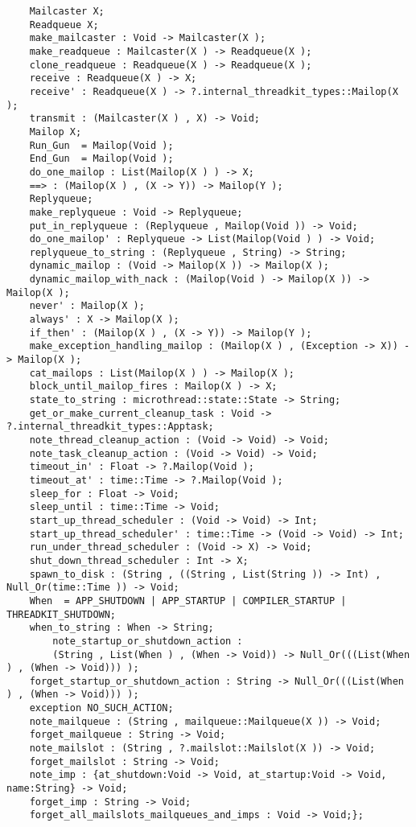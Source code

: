 \begin{verbatim}
    Mailcaster X;
    Readqueue X;
    make_mailcaster : Void -> Mailcaster(X );
    make_readqueue : Mailcaster(X ) -> Readqueue(X );
    clone_readqueue : Readqueue(X ) -> Readqueue(X );
    receive : Readqueue(X ) -> X;
    receive' : Readqueue(X ) -> ?.internal_threadkit_types::Mailop(X );
    transmit : (Mailcaster(X ) , X) -> Void;
    Mailop X;
    Run_Gun  = Mailop(Void );
    End_Gun  = Mailop(Void );
    do_one_mailop : List(Mailop(X ) ) -> X;
    ==> : (Mailop(X ) , (X -> Y)) -> Mailop(Y );
    Replyqueue;
    make_replyqueue : Void -> Replyqueue;
    put_in_replyqueue : (Replyqueue , Mailop(Void )) -> Void;
    do_one_mailop' : Replyqueue -> List(Mailop(Void ) ) -> Void;
    replyqueue_to_string : (Replyqueue , String) -> String;
    dynamic_mailop : (Void -> Mailop(X )) -> Mailop(X );
    dynamic_mailop_with_nack : (Mailop(Void ) -> Mailop(X )) -> Mailop(X );
    never' : Mailop(X );
    always' : X -> Mailop(X );
    if_then' : (Mailop(X ) , (X -> Y)) -> Mailop(Y );
    make_exception_handling_mailop : (Mailop(X ) , (Exception -> X)) -> Mailop(X );
    cat_mailops : List(Mailop(X ) ) -> Mailop(X );
    block_until_mailop_fires : Mailop(X ) -> X;
    state_to_string : microthread::state::State -> String;
    get_or_make_current_cleanup_task : Void -> ?.internal_threadkit_types::Apptask;
    note_thread_cleanup_action : (Void -> Void) -> Void;
    note_task_cleanup_action : (Void -> Void) -> Void;
    timeout_in' : Float -> ?.Mailop(Void );
    timeout_at' : time::Time -> ?.Mailop(Void );
    sleep_for : Float -> Void;
    sleep_until : time::Time -> Void;
    start_up_thread_scheduler : (Void -> Void) -> Int;
    start_up_thread_scheduler' : time::Time -> (Void -> Void) -> Int;
    run_under_thread_scheduler : (Void -> X) -> Void;
    shut_down_thread_scheduler : Int -> X;
    spawn_to_disk : (String , ((String , List(String )) -> Int) , Null_Or(time::Time )) -> Void;
    When  = APP_SHUTDOWN | APP_STARTUP | COMPILER_STARTUP | THREADKIT_SHUTDOWN;
    when_to_string : When -> String;
        note_startup_or_shutdown_action :
        (String , List(When ) , (When -> Void)) -> Null_Or(((List(When ) , (When -> Void))) );
    forget_startup_or_shutdown_action : String -> Null_Or(((List(When ) , (When -> Void))) );
    exception NO_SUCH_ACTION;
    note_mailqueue : (String , mailqueue::Mailqueue(X )) -> Void;
    forget_mailqueue : String -> Void;
    note_mailslot : (String , ?.mailslot::Mailslot(X )) -> Void;
    forget_mailslot : String -> Void;
    note_imp : {at_shutdown:Void -> Void, at_startup:Void -> Void, name:String} -> Void;
    forget_imp : String -> Void;
    forget_all_mailslots_mailqueues_and_imps : Void -> Void;};
\end{verbatim}
